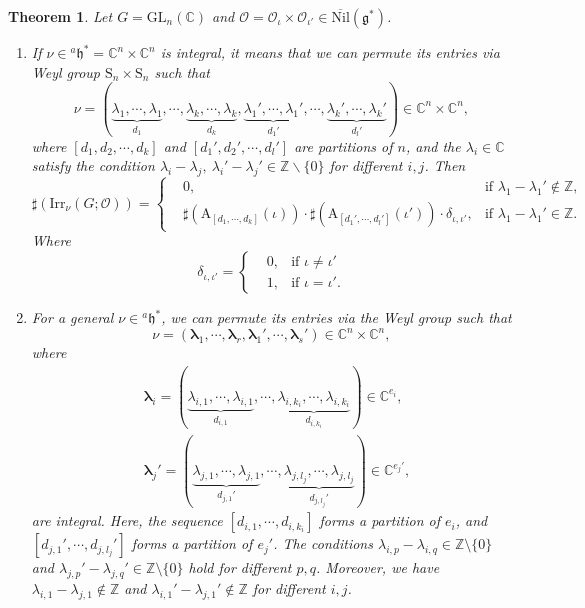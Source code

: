 \documentclass[12pt, a4paper]{amsart}
\numberwithin{equation}{section}
\newtheorem{thm}{Theorem}[section]
\newcommand{\blam}{{\boldsymbol{\lambda}}}
\newcommand{\BC}{{\mathbb {C}}}
\newcommand{\BZ}{{\mathbb {Z}}}
\newcommand{\CO}{{\mathcal {O}}}
\newcommand{\fg}{\mathfrak{g}}
\newcommand{\fh}{\mathfrak{h}}
\newcommand{\GL}{{\mathrm{GL}}}
\newcommand{\A}{{\mathrm{A}}}
\newcommand{\Irr}{{\mathrm{Irr}}}
\newcommand{\Nil}{{\mathrm{Nil}}}
\renewcommand{\bar}{\overline}
\begin{document}
\begin{thm}\label{C}
    Let $G = \GL_{n}(\BC)$ and $\CO = \CO_{\iota} \times \CO_{\iota'} \in \bar{\Nil}(\fg^*)$.
    \begin{enumerate}
        \item If $\nu \in {^a\fh^*} = \BC^n \times \BC^n$ is integral, it means that we can permute its entries via Weyl group $\mathrm{S}_n \times \mathrm{S}_n$ such that
        \[
        \nu =  (\underbrace{\lambda_1, \cdots, \lambda_1}_{d_1}, \cdots, \underbrace{\lambda_k, \cdots, \lambda_k}_{d_k}, \underbrace{\lambda_1', \cdots, \lambda_1'}_{d_1'}, \cdots, \underbrace{\lambda_k', \cdots, \lambda_k'}_{d_{l}'} ) \in \BC^n \times \BC^n, 
        \]
        where $[d_1,d_2,\cdots,d_k]$ and $[d_1',d_2',\cdots,d_l']$ are partitions of $n$, and the $\lambda_i \in \BC$ satisfy the condition $\lambda_i - \lambda_j, \ \lambda_i' - \lambda_j' \in \BZ \backslash \{0\}$ for different $i,j$. Then
        \begin{equation}
            \sharp(\Irr_{\nu}(G;\CO)) = \left\{ 
            \begin{aligned}
                &0, & \textrm{if $\lambda_1 - \lambda_1' \notin \BZ$},\\
                &\sharp(\A_{[d_1,\cdots,d_k]}(\iota)) \cdot \sharp(\A_{[d_1',\cdots,d_l']}(\iota')) \cdot \delta_{\iota,\iota'} , & \textrm{if $\lambda_1 - \lambda_1' \in \BZ$}.
            \end{aligned}
            \right.
        \end{equation}
        Where $$\delta_{\iota,\iota'} = \left\{
        \begin{aligned}
            &0, & \textrm{if $\iota \neq  \iota'$}\\
            &1, & \textrm{if $\iota = \iota'$}.
        \end{aligned}
        \right.$$
        \item For a general $\nu \in {^{a}\fh^*}$, we can permute its entries via the Weyl group such that
        \[
        \nu = (\blam_1, \cdots, \blam_r, \blam_1', \cdots, \blam_s') \in \BC^n \times \BC^n,
        \]
        where 
        \begin{align}
            &\blam_i = (\underbrace{\lambda_{i,1}, \cdots, \lambda_{i,1}}_{d_{i,1}}, \cdots, \underbrace{\lambda_{i,k_i}, \cdots, \lambda_{i,k_i}}_{d_{i,k_i}}) \in \BC^{e_i},\\
            &\blam_j' = (\underbrace{\lambda_{j,1}, \cdots, \lambda_{j,1}}_{d_{j,1}'}, \cdots, \underbrace{\lambda_{j,l_j}, \cdots, \lambda_{j,l_j}}_{d_{j,l_j}'}) \in \BC^{e_j'},
        \end{align}
        are integral. Here, the sequence $[d_{i,1}, \cdots, d_{i,k_i}]$ forms a partition of $e_i$, and $[d_{j,1}', \cdots, d_{j,l_j}']$ forms a partition of $e_j'$. The conditions $\lambda_{i,p} - \lambda_{i,q} \in \BZ \setminus \{0\}$ and $\lambda_{j,p}' - \lambda_{j,q}' \in \BZ \setminus \{0\}$ hold for different $p,q$. Moreover, we have $\lambda_{i,1} - \lambda_{j,1} \notin \BZ$ and $\lambda_{i,1}' - \lambda_{j,1}' \notin \BZ$ for different $i,j$. 
    

\end{enumerate}
\end{thm}
\end{document}
